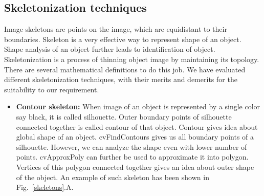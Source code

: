 \subsection{Skeletonization techniques}
\indent Image skeletons are points on the image, which are equidistant
to their boundaries. Skeleton is a very effective way to represent
shape of an object. Shape analysis of an object further leads to
identification of object. Skeletonization is a process of thinning
object image by maintaining its topology. There are several mathematical
definitions to do this job. We have evaluated different skeletonization
techniques, with their merits and demerits for the suitability to our
requirement.
\begin{itemize}
\item \textbf{Contour skeleton:} When image of an object is represented by
 a single color say black, it is called silhouette. Outer boundary
 points of silhouette connected together is called contour of
 that object. Contour gives idea about global shape of an object.
 cvFindContours gives us all boundary points of a silhouette.
 However, we can analyze the shape even with lower number of
 points. cvApproxPoly can further be used to approximate it into
 polygon. Vertices of this polygon connected together gives an
 idea about outer shape of the object. An example of such
 skeleton has been shown in Fig.~\ref{skeletons}.A.


\end{itemize}
